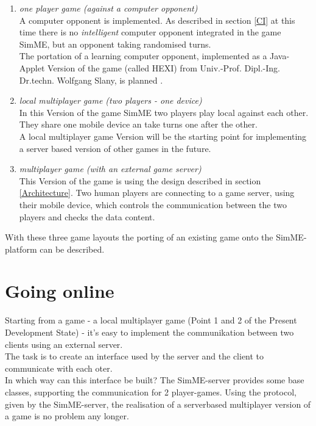 \begin{enumerate}
\item \textit{one player game (against a computer opponent)}\\
A computer opponent is implemented. As described in section \ref{CI} at this
time there is no \textit{intelligent} computer opponent integrated in the game
SimME, but an opponent taking randomised turns.\\
The portation of a learning computer opponent, implemented as a Java-Applet
Version of the game (called HEXI) from Univ.-Prof.
Dipl.-Ing. Dr.techn. Wolfgang Slany, is planned \cite{slany_paper}.

\item \textit{local multiplayer game (two players - one device)}\\
In this Version of the game SimME two players play local against each other.
They share one mobile device an take turns one after the other.\\
A local multiplayer game Version will be the starting point for implementing
a server based version of other games in the future.

\item \textit{multiplayer game (with an external game server)}\\
This Version of the game is using the design described in section
\ref{Architecture}. Two human players are connecting to a game server, using
their mobile device, which controls the communication between the two players
and checks the data content.
\end{enumerate}

With these three game layouts the porting of an existing game onto the
SimME-platform can be described.\\

\section{Going online} \label{going_online}
Starting from a game - a local multiplayer game (Point 1 and 2 of the Present
Development State) - it's easy to implement the communikation between two
clients using an external server.\\
The task is to create an interface used by the server and the client to
communicate with each oter.\\

In which way can this interface be built? The SimME-server provides some base
classes, supporting the communication for 2 player-games. Using the protocol,
given by the SimME-server, the realisation of a serverbased multiplayer version
of a game is no problem any longer.

